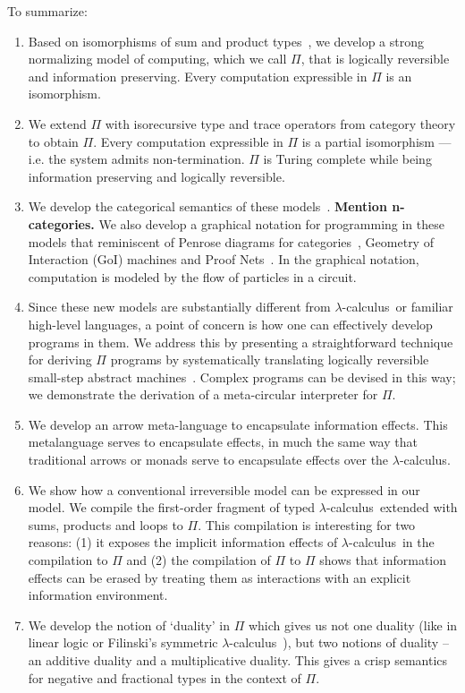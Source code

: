\documentclass{article}
\newcommand{\amr}[1]{\fbox{Amr says:} \textbf{#1}}
\newcommand{\lcal}{\ensuremath{\lambda}-calculus}
\begin{document}
To summarize:
\begin{enumerate}
\item Based on isomorphisms of sum and product
  types~\cite{Fiore:2004}, we develop a strong normalizing model of
  computing, which we call $\Pi$, that is logically reversible and
  information preserving. Every computation expressible in $\Pi$
  is an isomorphism.

\item We extend $\Pi$ with isorecursive type and trace operators from
  category theory to obtain $\Pi$. Every computation expressible in
  $\Pi$ is a partial isomorphism --- i.e. the system admits
  non-termination. $\Pi$ is Turing complete while being information
  preserving and logically reversible.

\item We develop the categorical semantics of these
  models~\cite{rc2011}. \amr{Mention n-categories.} We also develop
  a graphical notation for programming in these models that
  reminiscent of Penrose diagrams for
  categories~\cite{selinger-graphical}, Geometry of Interaction (GoI)
  machines and Proof
  Nets~\cite{Mackie2011,DBLP:conf/popl/Mackie95}. In the graphical
  notation, computation is modeled by the flow of particles in a
  circuit.

\item Since these new models are substantially different from \lcal\
  or familiar high-level languages, a point of concern is how one can
  effectively develop programs in them.  We address this by presenting
  a straightforward technique for deriving $\Pi$ programs by
  systematically translating logically reversible small-step abstract
  machines~\cite{isoint}. Complex programs can be devised in this way;
  we demonstrate the derivation of a meta-circular interpreter for
  $\Pi$.

\item We develop an arrow meta-language to encapsulate information
  effects. This metalanguage serves to encapsulate effects, in much
  the same way that traditional arrows or monads serve to encapsulate
  effects over the \lcal.

\item We show how a conventional irreversible model can be expressed
  in our model. We compile the first-order fragment of typed \lcal\
  extended with sums, products and loops to $\Pi$. This compilation is
  interesting for two reasons: (1) it exposes the implicit information
  effects of \lcal\ in the compilation to $\Pi$ and (2) the
  compilation of $\Pi$ to $\Pi$ shows that information effects can be
  erased by treating them as interactions with an explicit information
  environment.

\item We develop the notion of `duality' in $\Pi$ which gives us not
  one duality (like in linear logic or Filinski's symmetric
  \lcal~\cite{Filinski:89}), but two notions of duality -- an additive
  duality and a multiplicative duality. This gives a crisp semantics
  for negative and fractional types in the context of $\Pi$.

\end{enumerate}
\end{document}
